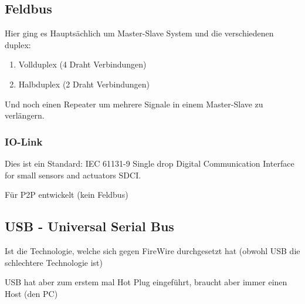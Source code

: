 \documentclass[a4paper]{article}
\begin{document}
\subsection{Feldbus}

Hier ging es Hauptsächlich um Master-Slave System und die verschiedenen duplex:

\begin{enumerate}
    \item Vollduplex (4 Draht Verbindungen)
    \item Halbduplex (2 Draht Verbindungen)
\end{enumerate}

Und noch einen Repeater um mehrere Signale in einem Master-Slave zu verlängern.

\subsubsection*{IO-Link}

Dies ist ein Standard: IEC 61131-9 Single drop Digital Communication Interface for small sensors and actuators SDCI.

Für P2P entwickelt (kein Feldbus)

\subsection{USB - Universal Serial Bus}

Ist die Technologie, welche sich gegen FireWire durchgesetzt hat (obwohl USB die schlechtere Technologie ist)

USB hat aber zum erstem mal Hot Plug eingeführt, braucht aber immer einen Host (den PC)
\end{document}

